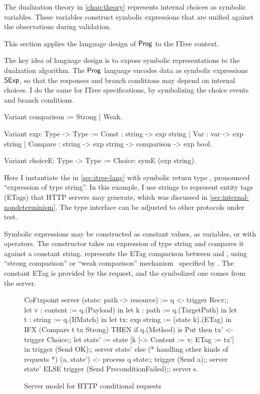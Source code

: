 The dualization theory in \autoref{chap:theory} represents internal choices as
symbolic variables.  These variables construct symbolic expressions that are
unified against the observations during validation.

This section applies the language design of $\mathsf{Prog}$ to the ITree context.


The key idea of language design is to expose symbolic representations to the
dualzation algorithm.  The $\mathsf{Prog}$ language encodes data as symbolic expressions
$\mathsf{SExp}$, so that the responses and branch conditions may depend on internal
choices.  I do the same for ITree specifications, by symbolizing the choice
events and branch conditions.



\begin{coq}
  Variant comparison := Strong | Weak.

  Variant exp: Type -> Type :=
    Const   : string -> exp string
  | Var     : var    -> exp string
  | Compare : string -> exp string -> comparison -> exp bool.

  Variant choiceE: Type -> Type :=
    Choice: symE (exp string).
\end{coq}

Here I instantiate the  in \autoref{sec:itree-lang} with symbolic
return type , pronounced ``expression of type string''.  In
this example, I use strings to represent entity tags (ETags) that HTTP servers
may generate, which was discussed in \autoref{sec:internal-nondeterminism}.  The
type interface can be adjusted to other protocols under test.

Symbolic expressions may be constructed as constant values, as variables, or
with operators.  The  constructor takes an expression of type
string and compares it against a constant string.  
represents the ETag comparison between  and , using ``strong
comparison'' or ``weak comparison'' mechanism~\cite{rfc7232} specified by
.  The constant ETag is provided by the request, and the symbolized one
comes from the server.

\begin{figure}
\begin{coq}
  CoFixpoint server (state: path -> resource) :=
    q <- trigger Recv;;
    let v : content    := q.(Payload)      in
    let k : path       := q.(TargetPath)   in
    let t : string     := q.(IfMatch)      in
    let tx: exp string := (state k).(ETag) in
    IFX (Compare t tx Strong)
    THEN
      if q.(Method) is Put
      then
        tx' <- trigger Choice;;
        let state' := state [k |-> {Content := v; ETag := tx'}] in
        trigger (Send OK);;
        server state'
      else                 (* handling other kinds of requests *)
        (a, state') <- process q state;;
        trigger (Send a);;
        server state'
    ELSE
      trigger (Send PreconditionFailed);;
      server s.
\end{coq}
\caption{Server model for HTTP conditional requests}
\label{fig:if-match-server}
\end{figure}

